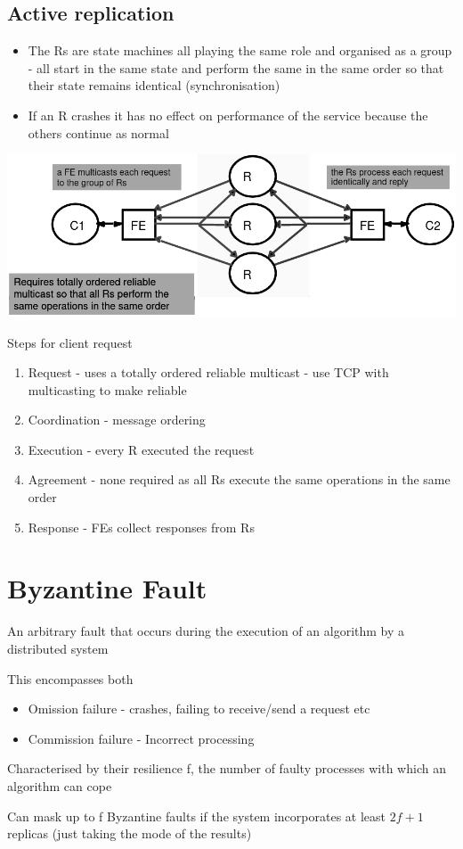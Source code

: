 \documentclass{article}[18pt]
\begin{document}
\subsection{Active replication}
\begin{itemize}
	\item The Rs are state machines all playing the same role and organised as a group - all start in the same state and perform the same in the same order so that their state remains identical (synchronisation)
	\item If an R crashes it has no effect on performance of the service because the others continue as normal
\end{itemize}
\begin{center}
	\includegraphics[scale=0.7]{"Active Replication"}
\end{center}
Steps for client request
\begin{enumerate}
	\item Request - uses a totally ordered reliable multicast - use TCP with multicasting to make reliable
	\item Coordination - message ordering
	\item Execution - every R executed the request
	\item Agreement - none required as all Rs execute the same operations in the same order
	\item Response - FEs collect responses from Rs
\end{enumerate}
\section{Byzantine Fault}
\begin{definition}
	An arbitrary fault that occurs during the execution of an algorithm by a distributed system
\end{definition}
This encompasses both
\begin{itemize}
	\item Omission failure - crashes, failing to receive/send a request etc
	\item Commission failure - Incorrect processing
\end{itemize}
\begin{definition}
	Characterised by their resilience f, the number of faulty processes with which an algorithm can cope
\end{definition}
Can mask up to f Byzantine faults if the system incorporates at least $2f+1$ replicas (just taking the mode of the results)
\end{document}
